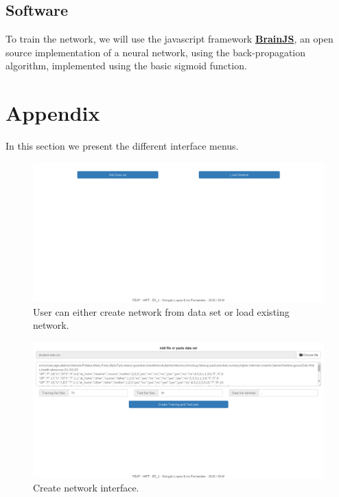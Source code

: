 \documentclass[11pt]{article}
\begin{document}
\subsection{Software}

To train the network, we will use the javascript framework \href{https://github.com/harthur/brain}{\textbf{BrainJS}}, an open source implementation of a neural network, using the back-propagation algorithm, implemented using the basic sigmoid function.

\newpage
\section{Appendix}
In this section we present the different interface menus.

\begin{figure}[H]
\label{fig:example}
\includegraphics[scale=0.3]{interface0.png}
\centering
\caption{User can either create network from data set or load existing network.}
\end{figure}

\begin{figure}[H]
\label{fig:example}
\includegraphics[scale=0.3]{interface1.png}
\centering
\caption{Create network interface.}
\end{figure}
\end{document}

